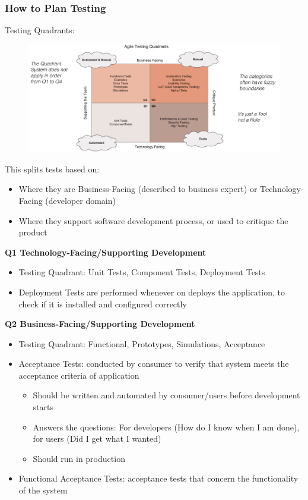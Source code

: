 \documentclass{article}
\begin{document}
\subsubsection{How to Plan Testing}
Testing Quadrants:
\begin{figure}[H]
    \centering
    \includegraphics[width = 0.9\linewidth]{Pictures/Screenshot 2023-02-11 at 15.41.28.png}
\end{figure}
This splits tests based on:
\begin{itemize}
    \item Where they are Business-Facing (described to business expert) or Technology-Facing (developer domain)
    \item Where they support software development process, or used to critique the product
\end{itemize}
\textbf{Q1 Technology-Facing/Supporting Development} 
\begin{itemize}
    \item Testing Quadrant: Unit Tests, Component Tests, Deployment Tests
    \item Deployment Tests are performed whenever on deploys the application, to check if it is installed and configured correctly
\end{itemize}
\textbf{Q2 Business-Facing/Supporting Development}
\begin{itemize}
    \item Testing Quadrant: Functional, Prototypes, Simulations, Acceptance
    \item Acceptance Tests: conducted by consumer to verify that system meets the acceptance criteria of application
    \begin{itemize}
        \item Should be written and automated by consumer/users before development starts
        \item Answers the questions: For developers (How do I know when I am done), for users (Did I get what I wanted)
        \item Should run in production
    \end{itemize}
    \item Functional Acceptance Tests: acceptance tests that concern the functionality of the system
\end{itemize}
\end{document}
